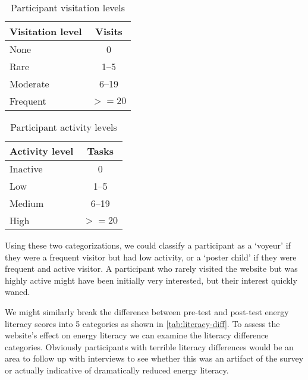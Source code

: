 \begin{table}[htbp]
	\centering
		\begin{tabular}{| l | c |}
			\hline
			Visitation level & Visits \\ \hline
			
			None & 0 \\ \hline
	
			Rare & 1--5 \\ \hline

			Moderate & 6--19 \\ \hline

			Frequent & $>= 20$ \\ \hline

		\end{tabular}
	\caption{Participant visitation levels}
	\label{tab:visitation-levels}
\end{table}


\begin{table}[htbp]
	\centering
		\begin{tabular}{| l | c |}
			\hline
			Activity level & Tasks \\ \hline
			
			Inactive & 0 \\ \hline
	
			Low & 1--5 \\ \hline

			Medium & 6--19 \\ \hline

			High & $>= 20$ \\ \hline

		\end{tabular}
	\caption{Participant activity levels}
	\label{tab:activity-levels}
\end{table}

Using these two categorizations, we could classify a participant as a `voyeur' if they were a frequent visitor but had low activity, or a `poster child' if they were frequent and active visitor. A participant who rarely visited the website but was highly active might have been initially very interested, but their interest quickly waned.

We might similarly break the difference between pre-test and post-test energy literacy scores into 5 categories as shown in \autoref{tab:literacy-diff}. To assess the website's effect on energy literacy we can examine the literacy difference categories. Obviously participants with terrible literacy differences would be an area to follow up with interviews to see whether this was an artifact of the survey or actually indicative of dramatically reduced energy literacy.


